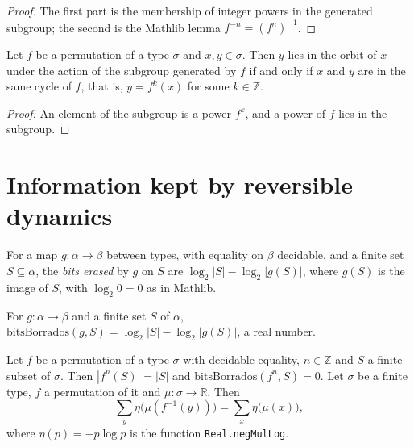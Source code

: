 \begin{proof}
  \leanok
  The first part is the membership of integer powers in the generated subgroup; the second is the
  Mathlib lemma $f^{-n} = (f^{n})^{-1}$.
\end{proof}

\begin{theorem}
  \label{thm:dynamics-orbits-cycles}
  \leanok
  Let $f$ be a permutation of a type $\sigma$ and $x, y \in \sigma$. Then $y$ lies in the orbit of
  $x$ under the action of the subgroup generated by $f$ if and only if $x$ and $y$ are in the same
  cycle of $f$, that is, $y = f^{k}(x)$ for some $k \in \mathbb{Z}$.
  \own{}
\end{theorem}

\begin{proof}
  \leanok
  An element of the subgroup is a power $f^{k}$, and a power of $f$ lies in the subgroup.
\end{proof}

\section{Information kept by reversible dynamics}
\label{sec:dynamics-information}

For a map $g : \alpha \to \beta$ between types, with equality on $\beta$ decidable, and a finite
set $S \subseteq \alpha$, the \emph{bits erased} by $g$ on $S$ are
$\log_2 |S| - \log_2 |g(S)|$, where $g(S)$ is the image of $S$, with $\log_2 0 = 0$ as in Mathlib.

\begin{definition}
  \label{def:dynamics-bits-erased}
  \leanok
  For $g : \alpha \to \beta$ and a finite set $S$ of $\alpha$,
  $\mathrm{bitsBorrados}(g, S) = \log_2 |S| - \log_2 |g(S)|$, a real number.
  \own{}
\end{definition}

\begin{theorem}
  \label{thm:dynamics-perm-keeps-information}
  \leanok
  Let $f$ be a permutation of a type $\sigma$ with decidable equality, $n \in \mathbb{Z}$ and
  $S$ a finite subset of $\sigma$. Then $|f^{n}(S)| = |S|$ and
  $\mathrm{bitsBorrados}(f^{n}, S) = 0$. Let $\sigma$ be a finite type, $f$ a permutation of it
  and $\mu : \sigma \to \mathbb{R}$. Then
  \[
    \sum_{y} \eta\bigl(\mu(f^{-1}(y))\bigr) = \sum_{x} \eta\bigl(\mu(x)\bigr),
  \]
  where $\eta(p) = -p \log p$ is the function \texttt{Real.negMulLog}.
  \own{}
\end{theorem}

